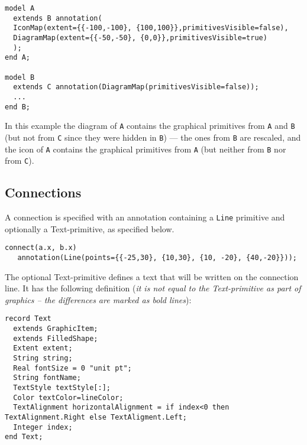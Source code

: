 \begin{example}
\begin{lstlisting}[language=modelica]
model A
  extends B annotation(
  IconMap(extent={{-100,-100}, {100,100}},primitivesVisible=false),
  DiagramMap(extent={{-50,-50}, {0,0}},primitivesVisible=true)
  );
end A;

model B
  extends C annotation(DiagramMap(primitivesVisible=false));
  ...
end B;
\end{lstlisting}
In this example the diagram of \lstinline!A! contains the graphical primitives
from \lstinline!A! and \lstinline!B! (but not from \lstinline!C! since they were hidden in \lstinline!B!) --- the ones
from \lstinline!B! are rescaled, and the icon of \lstinline!A! contains the graphical primitives
from \lstinline!A! (but neither from \lstinline!B! nor from \lstinline!C!).
\end{example}

\subsection{Connections}

A connection is specified with an annotation containing a \lstinline!Line! primitive
and optionally a Text-primitive, as specified below.

\begin{example}
\begin{lstlisting}[language=modelica]
  connect(a.x, b.x)
   annotation(Line(points={{-25,30}, {10,30}, {10, -20}, {40,-20}}));
\end{lstlisting}
\end{example}

The optional Text-primitive defines a text that will be written on the
connection line. It has the following definition (\emph{it is not equal
to the Text-primitive as part of graphics -- the differences are marked as bold lines}):
\begin{lstlisting}[language=modelica,escapechar=!,emph={horizontalAlignment,string,index}, emphstyle=\textbf]
record Text
  extends GraphicItem;
  extends FilledShape;
  Extent extent;
  String string;
  Real fontSize = 0 "unit pt";
  String fontName;
  TextStyle textStyle[:];
  Color textColor=lineColor;
  TextAlignment horizontalAlignment = if index<0 then TextAlignment.Right else TextAligment.Left;
  Integer index;
end Text;
\end{lstlisting}


